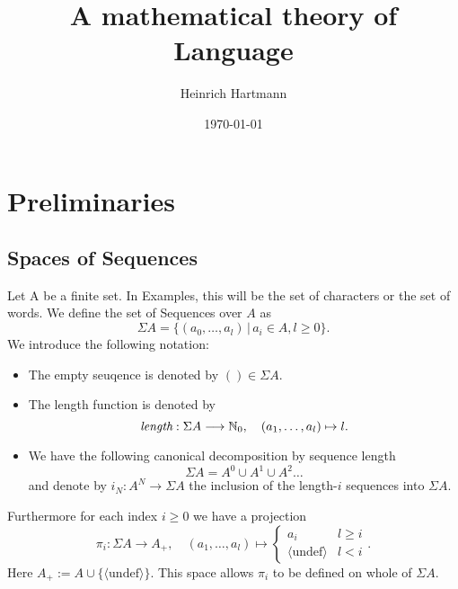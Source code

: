 \documentclass[11pt]{article}
\author{Heinrich Hartmann}
\date{\today}
\title{A mathematical theory of Language}
\begin{document}
\maketitle
\tableofcontents


\newcommand{\DEF}[1]{{\it #1}} %
\newcommand{\EQUIV}{\Leftrightarrow} %

\newcommand{\IN}{{\mathbb N}}
\newcommand{\IR}{{\mathbb R}}
\newcommand{\ra}{\rightarrow}
\newcommand{\lra}{\longrightarrow}
\newcommand{\union}{\cup}
\newcommand{\isect}{\cap}
 
\section{Preliminaries}
\subsection{Spaces of Sequences}
\label{sec-1-1}

\newcommand{\SEQ}{\Sigma}
\newcommand{\len}{\text{\it length}}

Let A be a finite set. In Examples, this will be the set of characters
or the set of words. We define the set of Sequences over $A$ as 
\[ \SEQ A = \{ (a_0,\dots,a_l) \,|\, a_i \in A, l \geq 0 \}. \] 
We introduce the following notation:
\begin{itemize}
\item The empty seuqence is denoted by $() \in \SEQ A$.
\item The length function is denoted by
  \[ \len: \SEQ A \lra \IN_0,\quad (a_1,\dots,a_l) \mapsto l. \]
\item We have the following canonical decomposition by sequence length
\[ \SEQ A = A^0 \union A^1 \union A^2 \dots \]
and denote by $i_N: A^N \ra \SEQ A$ the inclusion of the length-$i$ sequences into $\SEQ A$.

\end{itemize}

\newcommand{\pr}[1]{{\pi_{#1}}}
\newcommand{\PR}[2]{{\pi_{#1}^{#2}}}
\newcommand{\undef}{\langle \mathrm{undef} \rangle}

Furthermore for each index $i \geq 0$ we have a projection
\[ \pr{i}: \SEQ A \lra A_+, \quad (a_1, \dots, a_l) \mapsto 
\begin{cases}
  a_i & l \geq i  \\
  \undef & l < i
\end{cases}
. \]
Here $A_+ := A \union \{ \undef \}$. This space allows
$\pr{i}$ to be defined on whole of $\SEQ A$.
\end{document}
